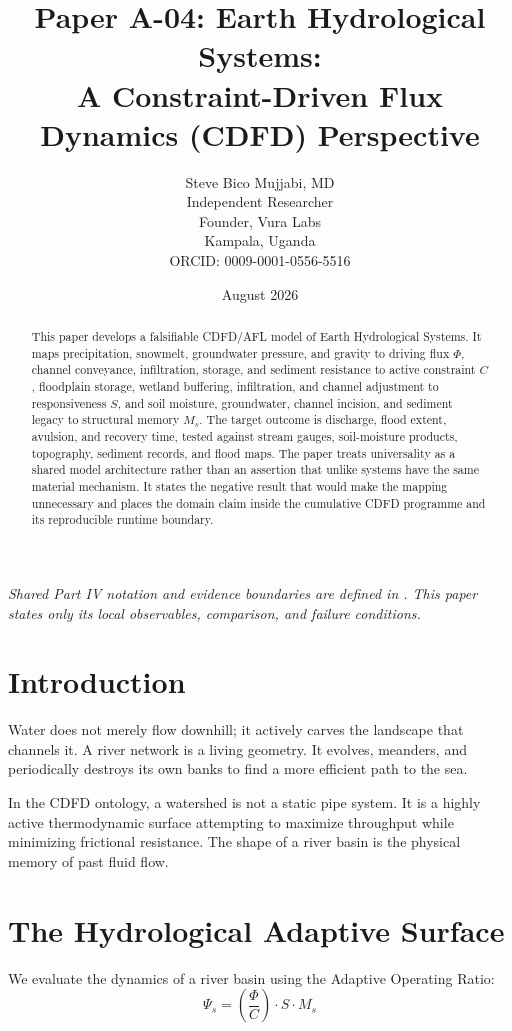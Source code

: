 \documentclass[11pt,a4paper]{article}
\title{\textbf{Paper A-04: Earth Hydrological Systems:\\ A Constraint-Driven Flux Dynamics (CDFD) Perspective}}
\author{Steve Bico Mujjabi, MD\\
\small Independent Researcher\\
\small Founder, Vura Labs\\
\small Kampala, Uganda\\
\small ORCID: 0009-0001-0556-5516}
\date{August 2026}
\begin{document}
\maketitle

\noindent\textit{Shared Part IV notation and evidence boundaries are defined in . This paper states only its local observables, comparison, and failure conditions.}


\begin{abstract}
This paper develops a falsifiable CDFD/AFL model of Earth Hydrological Systems. It maps precipitation, snowmelt, groundwater pressure, and gravity to driving flux $\Phi$, channel conveyance, infiltration, storage, and sediment resistance to active constraint $C$, floodplain storage, wetland buffering, infiltration, and channel adjustment to responsiveness $S$, and soil moisture, groundwater, channel incision, and sediment legacy to structural memory $M_s$. The target outcome is discharge, flood extent, avulsion, and recovery time, tested against stream gauges, soil-moisture products, topography, sediment records, and flood maps. The paper treats universality as a shared model architecture rather than an assertion that unlike systems have the same material mechanism. It states the negative result that would make the mapping unnecessary and places the domain claim inside the cumulative CDFD programme and its reproducible runtime boundary.
\end{abstract}

\section{Introduction}

Water does not merely flow downhill; it actively carves the landscape that channels it. A river network is a living geometry. It evolves, meanders, and periodically destroys its own banks to find a more efficient path to the sea.

In the CDFD ontology, a watershed is not a static pipe system. It is a highly active thermodynamic surface attempting to maximize throughput while minimizing frictional resistance. The shape of a river basin is the physical memory of past fluid flow.

\section{The Hydrological Adaptive Surface}
We evaluate the dynamics of a river basin using the Adaptive Operating Ratio:
\begin{equation}
    \Psi_s = \left( \frac{\Phi}{C} \right) \cdot S \cdot M_s
\end{equation}
\end{document}
